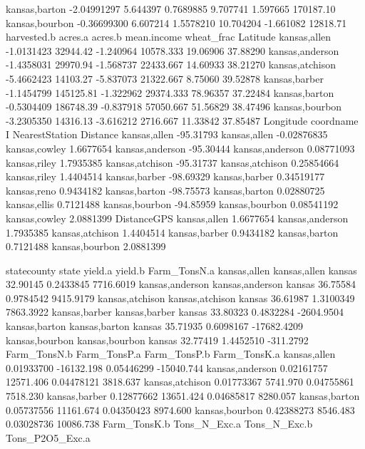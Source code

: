 \documentclass{report}
\begin{document}
\begin{Schunk}
\begin{Soutput}
kansas,barton   -2.04991297 5.644397  0.7689885  9.707741  1.597665   170187.10
kansas,bourbon  -0.36699300 6.607214  1.5578210 10.704204 -1.661082    12818.71
                harvested.b   acres.a   acres.b mean.income wheat_frac Latitude
kansas,allen     -1.0131423  32944.42 -1.240964   10578.333   19.06906 37.88290
kansas,anderson  -1.4358031  29970.94 -1.568737   22433.667   14.60933 38.21270
kansas,atchison  -5.4662423  14103.27 -5.837073   21322.667    8.75060 39.52878
kansas,barber    -1.1454799 145125.81 -1.322962   29374.333   78.96357 37.22484
kansas,barton    -0.5304409 186748.39 -0.837918   57050.667   51.56829 38.47496
kansas,bourbon   -3.2305350  14316.13 -3.616212    2716.667   11.33842 37.85487
                Longitude       coordname           I NearestStation  Distance
kansas,allen    -95.31793    kansas,allen -0.02876835  kansas,cowley 1.6677654
kansas,anderson -95.30444 kansas,anderson  0.08771093   kansas,riley 1.7935385
kansas,atchison -95.31737 kansas,atchison  0.25854664   kansas,riley 1.4404514
kansas,barber   -98.69329   kansas,barber  0.34519177    kansas,reno 0.9434182
kansas,barton   -98.75573   kansas,barton  0.02880725   kansas,ellis 0.7121488
kansas,bourbon  -94.85959  kansas,bourbon  0.08541192  kansas,cowley 2.0881399
                DistanceGPS
kansas,allen      1.6677654
kansas,anderson   1.7935385
kansas,atchison   1.4404514
kansas,barber     0.9434182
kansas,barton     0.7121488
kansas,bourbon    2.0881399
\end{Soutput}
\begin{Soutput}
                    statecounty  state  yield.a   yield.b Farm_TonsN.a
kansas,allen       kansas,allen kansas 32.90145 0.2433845    7716.6019
kansas,anderson kansas,anderson kansas 36.75584 0.9784542    9415.9179
kansas,atchison kansas,atchison kansas 36.61987 1.3100349    7863.3922
kansas,barber     kansas,barber kansas 33.80323 0.4832284   -2604.9504
kansas,barton     kansas,barton kansas 35.71935 0.6098167  -17682.4209
kansas,bourbon   kansas,bourbon kansas 32.77419 1.4452510    -311.2792
                Farm_TonsN.b Farm_TonsP.a Farm_TonsP.b Farm_TonsK.a
kansas,allen      0.01933700   -16132.198   0.05446299   -15040.744
kansas,anderson   0.02161757    12571.406   0.04478121     3818.637
kansas,atchison   0.01773367     5741.970   0.04755861     7518.230
kansas,barber     0.12877662    13651.424   0.04685817     8280.057
kansas,barton     0.05737556    11161.674   0.04350423     8974.600
kansas,bourbon    0.42388273     8546.483   0.03028736    10086.738
                Farm_TonsK.b Tons_N_Exc.a Tons_N_Exc.b Tons_P2O5_Exc.a

\end{Soutput}
\end{Schunk}
\end{document}
